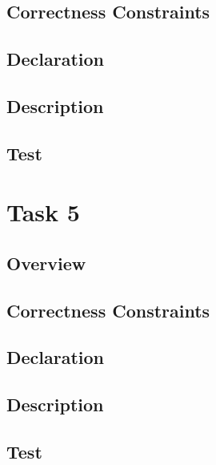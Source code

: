 \documentclass{article}
\begin{document}
\subsection{Correctness Constraints}
\subsection{Declaration}
\subsection{Description}
\subsection{Test}

\section{Task 5}
\subsection{Overview}
\subsection{Correctness Constraints}
\subsection{Declaration}
\subsection{Description}
\subsection{Test}
\end{document}
